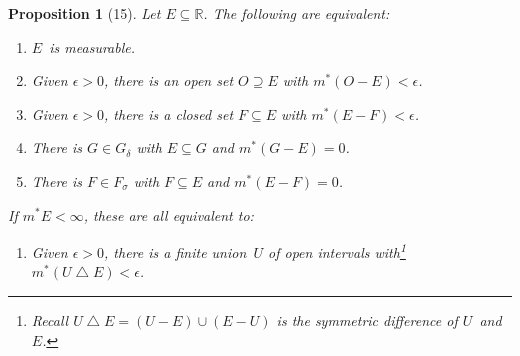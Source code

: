 \documentclass[letterpaper,12pt]{article}
\newcommand{\R}{\mathbb{R}}
\newcommand{\Gd}{G_{\delta}}
\newcommand{\Fs}{F_{\sigma}}
\newcommand{\union}{\cup}
\newcommand{\diff}{\bigtriangleup}
\newcommand{\mo}{m^*}
\theoremstyle{plain}
\newtheorem*{prop}{Proposition}
\theoremstyle{definition}
\theoremstyle{remark}
\begin{document}
\begin{prop}[15]
Let \(E\subseteq\R\). The following are equivalent:
\begin{enumerate}
\item[(i)] \(E\)~is measurable.
\item[(ii)] Given \(\epsilon>0\), there is an open set \(O\supseteq E\) with \(\mo(O-E)<\epsilon\).
\item[(iii)] Given \(\epsilon>0\), there is a closed set \(F\subseteq E\) with \(\mo(E-F)<\epsilon\).
\item[(iv)] There is \(G\in\Gd\) with \(E\subseteq G\) and \(\mo(G-E)=0\).
\item[(v)] There is \(F\in\Fs\) with \(F\subseteq E\) and \(\mo(E-F)=0\).
\end{enumerate}
If \(\mo E<\infty\), these are all equivalent to:
\begin{enumerate}
\item[(vi)] Given \(\epsilon>0\), there is a finite union~\(U\) of open intervals with\footnote{Recall \(U\diff E=(U-E)\union(E-U)\) is the symmetric difference of \(U\)~and~\(E\).} \(\mo(U\diff E)<\epsilon\).
\end{enumerate}
\end{prop}
\end{document}
